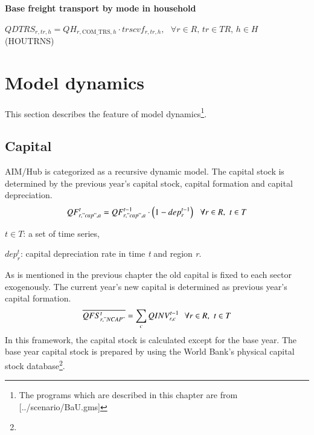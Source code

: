 \documentclass[10pt,a4paper,titlepage,dvipdfmx]{book}
\begin{document}
\begin{flushleft}\textbf{Base freight transport by mode in household}\end{flushleft}


\begin{center}$QDTRS_{r,tr,h}=QH_{r,\mathrm{COM}\_ \mathrm{TRS},h}\cdot trscvf_{r,tr,h},\,\,\,\,\forall r\in R,\,tr\in TR,\,h\in H$ (HOUTRNS)
\end{center}

\chapter{\label{chp:ModDyn}Model dynamics}

This section describes the feature of model dynamics\footnote{The programs which are described in this chapter are from [../scenario/BaU.gms]}.

\section{\label{sec:Capital}Capital}

AIM/Hub is categorized as a recursive dynamic model. The capital stock is determined by the previous year's capital stock, capital formation and capital depreciation.
\begin{equation}
\label{equ:capstok}
QF_{r,"cap",a}^{t}=QF_{r,"cap",a}^{t-1}\cdot \left(1-dep_{r}^{t-1}\right)\,\,\,\,\forall r\in R,\,\,t\in T
\end{equation}

\begin{center}$t\in T$: a set of time series,
\end{center}

\begin{flushleft} $dep_{r}^{t}$: capital depreciation rate in time \textit{t} and region \textit{r}. \end{flushleft}

As is mentioned in the previous chapter the old capital is fixed to each sector exogenously. The current year's new capital is determined as previous year's capital formation.
\begin{equation}
\label{equ:capstokInv}
\overline{QFS_{r,"NCAP"}^{t}}=\sum _{c}QINV_{r,c}^{t-1}\,\,\,\,\forall r\in R,\,\,t\in T
\end{equation}
In this framework, the capital stock is calculated except for the base year. The base year capital stock is prepared by using the World Bank's physical capital stock database\footnote{}.
\end{document}
